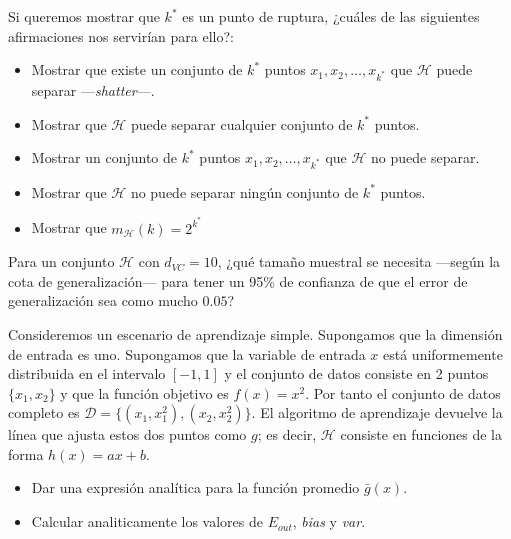 \documentclass[a4paper, 11pt]{article}
\begin{document}
    \begin{ejercicio}
        Si queremos mostrar que $k^*$ es un punto de ruptura, ¿cuáles de las siguientes afirmaciones nos servirían para ello?:
        \begin{itemize}
            \item Mostrar que existe un conjunto de $k^*$ puntos $x_1, x_2 , \dots , x_{k^*}$ que $\mathcal{H}$ puede separar ---\emph{shatter}---.
            \item Mostrar que $\mathcal{H}$ puede separar cualquier conjunto de $k^*$ puntos.
            \item Mostrar un conjunto de $k^*$ puntos $x_1, x_2 , \dots , x_{k^*}$ que $\mathcal{H}$ no puede separar.
            \item Mostrar que $\mathcal{H}$ no puede separar ningún conjunto de $k^*$ puntos.
            \item Mostrar que $m_\mathcal{H} (k) = 2^{k^*}$
        \end{itemize}
    \end{ejercicio}


    \begin{ejercicio}
        Para un conjunto $\mathcal{H}$ con $d_{VC} = 10$, ¿qué tamaño muestral se necesita ---según la cota de generalización--- para tener un 95\% de confianza de que el error de generalización sea como mucho $0.05$?
    \end{ejercicio}

    \begin{ejercicio}
        Consideremos un escenario de aprendizaje simple. Supongamos que la dimensión de entrada es uno. Supongamos que la variable de entrada $x$ está uniformemente distribuida en el intervalo $[-1, 1]$ y el conjunto de datos consiste en 2 puntos $\{x_1, x_2\}$ y que la función objetivo es $f(x) = x^2$. Por tanto el conjunto de datos completo es $\mathcal{D} = \{(x_1 , x_1^2), (x_2, x_2^2)\}$. El algoritmo de aprendizaje devuelve la línea que ajusta estos dos puntos como $g$; es decir, $\mathcal{H}$ consiste en funciones de la forma $h(x) = ax + b$.
        \begin{itemize}
            \item Dar una expresión analítica para la función promedio $\bar{g}(x)$.
            \item Calcular analiticamente los valores de $E_{out}$, \emph{bias} y \emph{var}.
        \end{itemize}
    \end{ejercicio}
\end{document}
